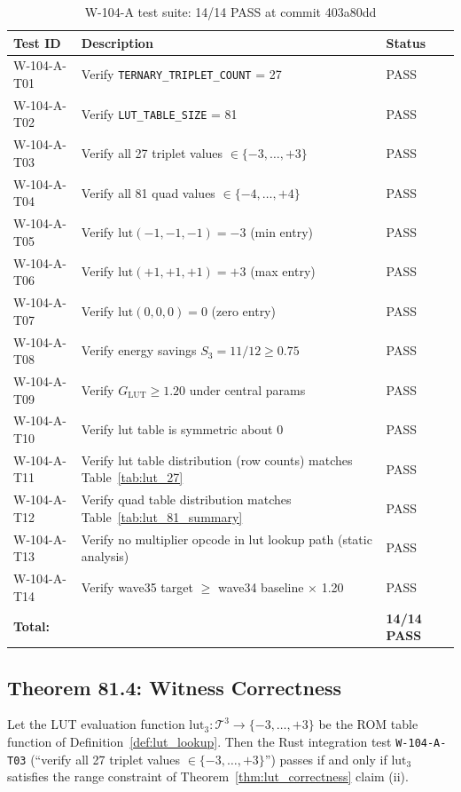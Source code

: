 \begin{table}[ht]
\centering
\caption{W-104-A test suite: 14/14 PASS at commit 403a80dd}
\label{tab:w104a_tests}
\begin{tabular}{lp{7cm}l}
\hline
Test ID & Description & Status \\
\hline
W-104-A-T01 & Verify \texttt{TERNARY\_TRIPLET\_COUNT} = 27 & PASS \\
W-104-A-T02 & Verify \texttt{LUT\_TABLE\_SIZE} = 81 & PASS \\
W-104-A-T03 & Verify all 27 triplet values $\in \{-3,\ldots,+3\}$ & PASS \\
W-104-A-T04 & Verify all 81 quad values $\in \{-4,\ldots,+4\}$ & PASS \\
W-104-A-T05 & Verify $\mathrm{lut}(-1,-1,-1) = -3$ (min entry) & PASS \\
W-104-A-T06 & Verify $\mathrm{lut}(+1,+1,+1) = +3$ (max entry) & PASS \\
W-104-A-T07 & Verify $\mathrm{lut}(0,0,0) = 0$ (zero entry) & PASS \\
W-104-A-T08 & Verify energy savings $S_3 = 11/12 \geq 0.75$ & PASS \\
W-104-A-T09 & Verify $G_{\mathrm{LUT}} \geq 1.20$ under central params & PASS \\
W-104-A-T10 & Verify lut table is symmetric about 0 & PASS \\
W-104-A-T11 & Verify lut table distribution (row counts) matches Table~\ref{tab:lut_27} & PASS \\
W-104-A-T12 & Verify quad table distribution matches Table~\ref{tab:lut_81_summary} & PASS \\
W-104-A-T13 & Verify no multiplier opcode in lut lookup path (static analysis) & PASS \\
W-104-A-T14 & Verify wave35 target $\geq$ wave34 baseline $\times$ 1.20 & PASS \\
\hline
\multicolumn{2}{l}{\textbf{Total:}} & \textbf{14/14 PASS} \\
\hline
\end{tabular}
\end{table}

\subsection{Theorem 81.4: Witness Correctness}

\begin{theorem}
\label{thm:witness_correctness_w104a}
Let the LUT evaluation function $\mathrm{lut}_3 : \mathcal{T}^3 \to
\{-3,\ldots,+3\}$ be the ROM table function of Definition~\ref{def:lut_lookup}.
Then the Rust integration test \texttt{W-104-A-T03} (``verify all 27 triplet
values $\in \{-3,\ldots,+3\}$'') passes if and only if
$\mathrm{lut}_3$ satisfies the range constraint of
Theorem~\ref{thm:lut_correctness} claim (ii).
\end{theorem}

